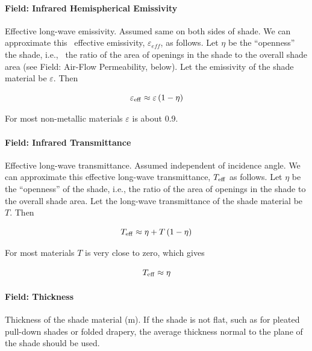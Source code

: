 \paragraph{Field: Infrared Hemispherical Emissivity}\label{field-infrared-hemispherical-emissivity-201710020805}

Effective long-wave emissivity. Assumed same on both sides of shade. We can approximate this~ effective emissivity, \(\varepsilon_{eff}\), as follows. Let \(\eta\) be the ``openness'' the shade, i.e.,~ the ratio of the area of openings in the shade to the overall shade area (see Field: Air-Flow Permeability, below). Let the emissivity of the shade material be \(\varepsilon\). Then

\begin{equation}
{\varepsilon_{{\rm{eff}}}} \approx \varepsilon \left( {1 - \eta } \right)
\end{equation}

For most non-metallic materials \(\varepsilon\) is about 0.9.

\paragraph{Field: Infrared Transmittance}\label{field-infrared-transmittance}

Effective long-wave transmittance. Assumed independent of incidence angle. We can approximate this effective long-wave transmittance, \(T_{\rm{eff}}\) as follows. Let \(\eta\) be the ``openness'' of the shade, i.e., the ratio of the area of openings in the shade to the overall shade area. Let the long-wave transmittance of the shade material be \(T\). Then

\begin{equation}
T_{\rm{eff}} \approx \eta + T \left( 1 - \eta \right)
\end{equation}

For most materials \(T\) is very close to zero, which gives

\begin{equation}
T_{\rm{eff}} \approx \eta
\end{equation}

\paragraph{Field: Thickness}\label{field-thickness-6}

Thickness of the shade material (m). If the shade is not flat, such as for pleated pull-down shades or folded drapery, the average thickness normal to the plane of the shade should be used.

